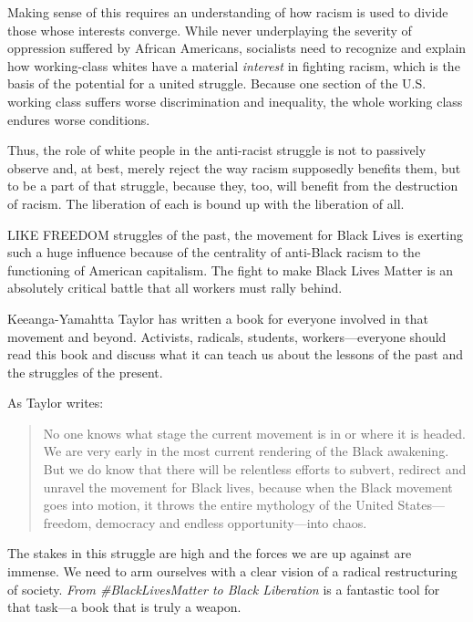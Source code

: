 Making sense of this requires an understanding of how racism is used to divide those whose interests converge. While never underplaying the severity of oppression suffered by African Americans, socialists need to recognize and explain how working-class whites have a material \emph{interest} in fighting racism, which is the basis of the potential for a united struggle. Because one section of the U.S. working class suffers worse discrimination and inequality, the whole working class endures worse conditions.

Thus, the role of white people in the anti-racist struggle is not to passively observe and, at best, merely reject the way racism supposedly benefits them, but to be a part of that struggle, because they, too, will benefit from the destruction of racism. The liberation of each is bound up with the liberation of all.

\sectiondivider

LIKE FREEDOM struggles of the past, the movement for Black Lives is exerting such a huge influence because of the centrality of anti-Black racism to the functioning of American capitalism. The fight to make Black Lives Matter is an absolutely critical battle that all workers must rally behind.

Keeanga-Yamahtta Taylor has written a book for everyone involved in that movement and beyond. Activists, radicals, students, workers---everyone should read this book and discuss what it can teach us about the lessons of the past and the struggles of the present.

As Taylor writes:

\blockquote{No one knows what stage the current movement is in or where it is headed. We are very early in the most current rendering of the Black awakening. But we do know that there will be relentless efforts to subvert, redirect and unravel the movement for Black lives, because when the Black movement goes into motion, it throws the entire mythology of the United States---freedom, democracy and endless opportunity---into chaos.}

The stakes in this struggle are high and the forces we are up against are immense. We need to arm ourselves with a clear vision of a radical restructuring of society. \emph{From \#BlackLivesMatter to Black Liberation} is a fantastic tool for that task---a book that is truly a weapon.
